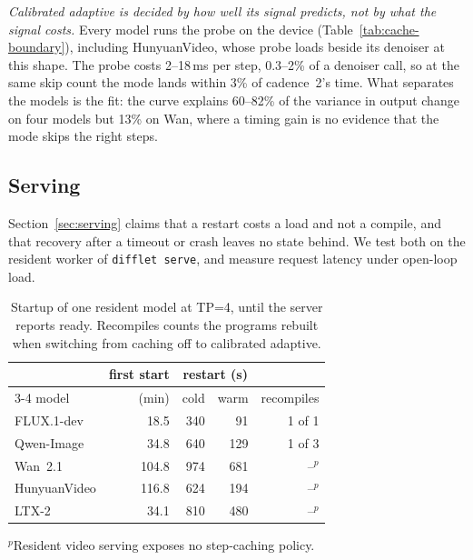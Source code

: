 \emph{Calibrated adaptive is decided by how well its signal predicts, not by what the signal costs.} Every model runs the probe on the device (Table~\ref{tab:cache-boundary}), including HunyuanVideo, whose probe loads beside its denoiser at this shape. The probe costs 2--18\,ms per step, 0.3--2\% of a denoiser call, so at the same skip count the mode lands within 3\% of cadence~2's time. What separates the models is the fit: the curve explains 60--82\% of the variance in output change on four models but 13\% on Wan, where a timing gain is no evidence that the mode skips the right steps.

\subsection{Serving}
\label{sec:serving-eval}

Section~\ref{sec:serving} claims that a restart costs a load and not a compile, and that recovery after a timeout or crash leaves no state behind. We test both on the resident worker of \texttt{difflet serve}, and measure request latency under open-loop load.

\begin{table}[t]
\caption{Startup of one resident model at TP=4, until the server reports ready. Recompiles counts the programs rebuilt when switching from caching off to calibrated adaptive.}
\label{tab:startup}
\centering
\footnotesize
\setlength{\tabcolsep}{4pt}
\begin{tabular}{@{}lrrrr@{}}
\toprule
& first start & \multicolumn{2}{c}{restart (s)} & \\
\cmidrule(lr){3-4}
model & (min) & cold & warm & recompiles \\
\midrule
FLUX.1-dev   & 18.5  & 340 & 91  & 1 of 1 \\
Qwen-Image   & 34.8  & 640 & 129 & 1 of 3 \\
Wan~2.1      & 104.8 & 974 & 681 & --$^{p}$ \\
HunyuanVideo & 116.8 & 624 & 194 & --$^{p}$ \\
LTX-2        & 34.1  & 810 & 480 & --$^{p}$ \\
\bottomrule
\end{tabular}
\par\smallskip
{\raggedright\scriptsize $^{p}$Resident video serving exposes no step-caching policy.\par}
\vskip -0.1in
\end{table}

